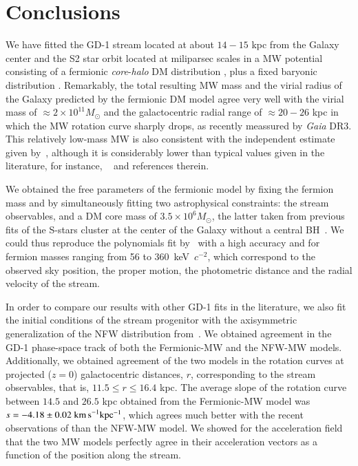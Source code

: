 \documentclass[referee]{aa} %
\begin{document}
\section{Conclusions}
\label{sec:conclusions}
We have fitted the GD-1 stream located at about $14-15$ kpc from the Galaxy center and the S2 star orbit located at miliparsec scales in a MW potential consisting of a fermionic \textit{core}-\textit{halo} DM distribution \citep{arguelles_novel_2018,2020A&A...641A..34B,2021MNRAS.505L..64B,2022MNRAS.511L..35A}, plus a fixed baryonic distribution \citep{2017A&A...598A..66P}. Remarkably, the total resulting MW mass and the virial radius of the Galaxy predicted by the fermionic DM model agree very well with the virial mass of $\approx 2\times 10^{11} M_\odot$ and the galactocentric radial range of $\approx 20-26$ kpc in which the MW rotation curve sharply drops, as recently meassured by \textit{Gaia} DR3. This relatively low-mass MW is also consistent with the independent estimate given by~\cite{2014MNRAS.445.3788G}, although it is considerably lower than typical values given in the literature, for instance, ~ and references therein.

We obtained the free parameters of the fermionic model by fixing the fermion mass and by simultaneously fitting two astrophysical constraints: the stream observables, and a
DM core mass of $3.5\times10^6M_\odot$, the latter taken from previous fits of the S-stars cluster at
the center of the Galaxy without a central BH~\citep{2020A&A...641A..34B,2021MNRAS.505L..64B}. We could thus reproduce the polynomials fit by~\citet{Ibata_2020} with a high accuracy and for fermion masses ranging from 56 to 360~keV~$c^{-2}$, which correspond to the observed sky position, the proper motion, the photometric distance and the radial velocity of the stream.

In order to compare our results with other GD-1 fits in the literature, we also fit the initial conditions of the stream progenitor with the  axisymmetric generalization of the NFW distribution from~\citet{2019MNRAS.486.2995M}. We obtained agreement in the GD-1 phase-space track of
both the Fermionic-MW and the NFW-MW models. Additionally, we obtained agreement of the two models in the rotation curves at projected ($z=0$) galactocentric distances, $r$, corresponding to the stream observables, that is, $11.5\leq r \leq 16.4$ kpc. The average slope of the rotation curve between $14.5$ and $26.5$ kpc obtained from the Fermionic-MW model was $s=-4.18 \pm 0.02~\rm{km\, s}^{-1} kpc^{-1}$, which agrees much better with the recent observations of \cite{Jiao2023} than the NFW-MW model. We showed for the acceleration field that the two MW models perfectly agree in their acceleration vectors as a function of the position along the stream.
\end{document}
